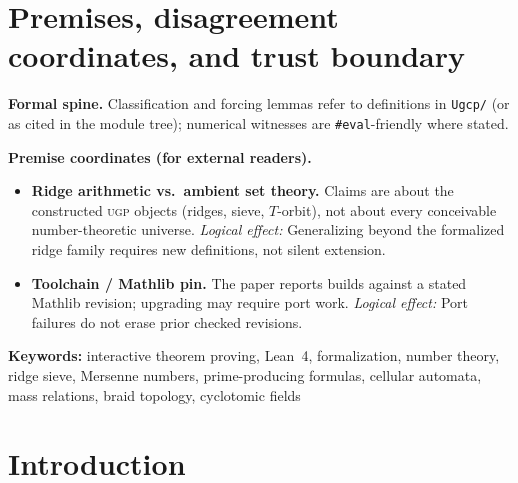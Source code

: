 \documentclass[11pt,a4paper]{article}
\newenvironment{keybox}[1]{%
  \Needspace*{8\baselineskip}%
  \begin{tcolorbox}[
    enhanced,
    breakable=false,
    colback=blue!5,
    colframe=blue!45!black,
    coltitle=black,
    colbacktitle=blue!14,
    boxrule=0.85pt,
    arc=2.5pt,
    left=9pt, right=9pt, top=6pt, bottom=6pt,
    titlerule=0.55pt,
    fonttitle=\bfseries,
    title={#1},
    before upper=\raggedright,
    before skip=0.9\baselineskip,
    after skip=0.9\baselineskip
  ]%
}{%
  \end{tcolorbox}%
}
\theoremstyle{definition}
\newcommand{\ugp}{\textsc{ugp}}
\begin{document}
\begin{abstract}
The library additionally formalizes the Elegant Kernel closure
($k_{\rm gen} = \varphi\cos(\pi/10)$), the Koide cyclotomic-12 closed
form with $S_3$-equivariant Newton flow, the full BraidAtlas charge
structure, neutrino mass-ratio arithmetic, and six formally stated open conjectures.
All proved statements are scoped to the ridged arithmetic framework.

\NovaZenodoInAbstract
\end{abstract}

{\footnotesize{}\begingroup\raggedright\tableofcontents\endgroup}
\clearpage
\bigskip

\section[Premises, Disagreement Coordinates, Trust Boundary]{Premises, disagreement coordinates, and trust boundary}\label{sec:premises-ugp-lean-paper}
\begin{keybox}{Where disagreement can (and cannot) live}
\textbf{Formal spine.}
Classification and forcing lemmas refer to definitions in \texttt{Ugcp/} (or as cited in the module tree); numerical witnesses are \texttt{\#eval}-friendly where stated.

\medskip
\textbf{Premise coordinates (for external readers).}
\begin{itemize}[leftmargin=2em]
\item \textbf{Ridge arithmetic vs.\ ambient set theory.} Claims are about the constructed \ugp{} objects (ridges, sieve, $T$-orbit), not about every conceivable number-theoretic universe.
  \emph{Logical effect:} Generalizing beyond the formalized ridge family requires new definitions, not silent extension.
\item \textbf{Tool\-chain / Math\-lib pin.} The paper reports builds against a stated
  Mathlib revision; upgrading may require port work.
  \emph{Logical effect:} Port failures do not erase prior checked revisions.
\end{itemize}
\end{keybox}

\smallskip
\noindent\textbf{Keywords:}
interactive theorem proving, Lean~4, formalization, number theory,
ridge sieve, Mersenne numbers, prime-producing formulas,
cellular automata, mass relations, braid topology, cyclotomic fields

\section{Introduction}\label{sec:intro}
\end{document}
